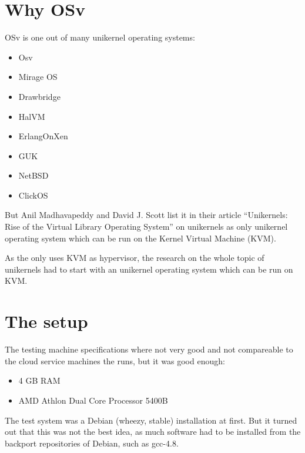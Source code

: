 
\chapter{Why OSv}

    OSv is one out of many unikernel operating systems:

        \begin{itemize}
            \item Osv
            \item Mirage OS
            \item Drawbridge
            \item HalVM
            \item ErlangOnXen
            \item GUK
            \item NetBSD
            \item ClickOS
        \end{itemize}\cite[S. 13]{unikernels}

    But Anil Madhavapeddy and David J. Scott list it in their article
    ``Unikernels: Rise of the Virtual Library Operating System'' on unikernels
    as only unikernel operating system which can be run on the Kernel Virtual
    Machine (KVM).

    As the \HFU{} only uses KVM as
    hypervisor, the research on the whole topic of unikernels had to start with
    an unikernel operating system which can be run on KVM.

\chapter{The setup}\label{chap:setup}

    The testing machine specifications where not very good and not compareable
    to the cloud service machines the \HFU{} runs, but it was good enough:

        \begin{itemize}
            \item 4 GB RAM
            \item AMD Athlon Dual Core Processor 5400B
        \end{itemize}

    The test system was a Debian (wheezy, stable) installation at first. But it
    turned out that this was not the best idea, as much software had to be
    installed from the backport repositories of Debian, such as gcc-4.8.

